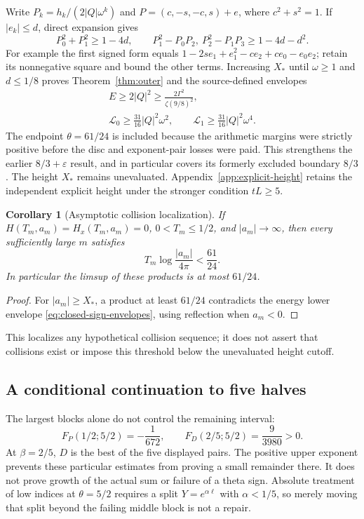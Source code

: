 \documentclass[11pt]{article}
\numberwithin{equation}{section}
\newtheorem{corollary}[theorem]{Corollary}
\theoremstyle{definition}
\theoremstyle{remark}
\newcommand{\Lag}{\mathcal L}
\begin{document}
Write $P_k=h_k/(2|Q|\omega^k)$ and
$P=(c,-s,-c,s)+e$, where $c^2+s^2=1$. If $|e_k|\le d$, direct
expansion gives
\begin{equation}
 P_0^2+P_1^2\ge1-4d,\qquad
 P_1^2-P_0P_2,\ P_2^2-P_1P_3\ge1-4d-d^2.
 \label{eq:explicit-perturbation}
\end{equation}
For example the first signed form equals
$1-2se_1+e_1^2-ce_2+ce_0-e_0e_2$; retain its nonnegative square
and bound the other terms. Increasing $X_*$ until $\omega\ge1$ and
$d\le1/8$ proves Theorem~\ref{thm:outer} and the source-defined envelopes
\begin{equation}
 \begin{gathered}
 E\ge2|Q|^2\ge\frac{2\Gamma^2}{\zeta(9/8)^2},\\
 \Lag_0\ge\frac{31}{16}|Q|^2\omega^2,\qquad
 \Lag_1\ge\frac{31}{16}|Q|^2\omega^4.
 \end{gathered}
 \label{eq:closed-sign-envelopes}
\end{equation}
The endpoint $\theta=61/24$ is included because the arithmetic margins
were strictly positive before the disc and exponent-pair losses were
paid. This strengthens the earlier $8/3+\varepsilon$ result, and in
particular covers its formerly excluded boundary $8/3$. The height
$X_*$ remains unevaluated. Appendix~\ref{app:explicit-height} retains
the independent explicit height under the stronger condition $tL\ge5$.

\begin{corollary}[Asymptotic collision localization]
\label{cor:threshold-closed}\label{cor:threshold-three}\label{cor:threshold-four}
If $H(T_m,a_m)=H_x(T_m,a_m)=0$, $0<T_m\le1/2$, and
$|a_m|\to\infty$, then every sufficiently large $m$ satisfies
\[
 T_m\log\frac{|a_m|}{4\pi}<\frac{61}{24}.
\]
In particular the limsup of these products is at most $61/24$.
\end{corollary}
\begin{proof}
For $|a_m|\ge X_*$, a product at least $61/24$ contradicts the energy
lower envelope \eqref{eq:closed-sign-envelopes}, using reflection when
$a_m<0$.
\end{proof}
This localizes any hypothetical collision sequence; it does not assert
that collisions exist or impose this threshold below the unevaluated
height cutoff.

\subsection{A conditional continuation to five halves}
The largest blocks alone do not control the remaining interval:
\[
 F_P(1/2;5/2)=-\frac1{672},\qquad
 F_D(2/5;5/2)=\frac9{3980}>0.
\]
At $\beta=2/5$, $D$ is the best of the five displayed pairs. The positive
upper exponent prevents these particular estimates from proving a small
remainder there. It does not prove growth of the actual sum or failure
of a theta sign. Absolute treatment of low indices at $\theta=5/2$
requires a split $Y=e^{\alpha\ell}$ with $\alpha<1/5$, so merely
moving that split beyond the failing middle block is not a repair.
\end{document}
